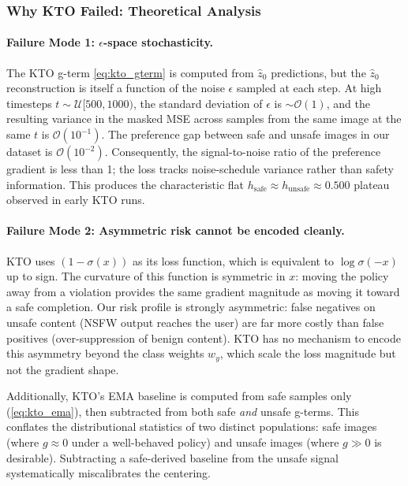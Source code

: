 \subsubsection{Why KTO Failed: Theoretical Analysis}

\paragraph{Failure Mode 1: $\epsilon$-space stochasticity.}
The KTO g-term \eqref{eq:kto_gterm} is computed from $\hat{z}_0$
predictions, but the $\hat{z}_0$ reconstruction is itself a function of
the noise $\epsilon$ sampled at each step.
At high timesteps $t \sim \mathcal{U}[500, 1000)$, the standard deviation
of $\epsilon$ is $\sim\!\mathcal{O}(1)$, and the resulting variance in the
masked MSE across samples from the same image at the same $t$ is
$\mathcal{O}(10^{-1})$.
The preference gap between safe and unsafe images in our dataset is
$\mathcal{O}(10^{-2})$.
Consequently, the signal-to-noise ratio of the preference gradient is less
than 1; the loss tracks noise-schedule variance rather than safety
information.
This produces the characteristic flat
$h_\text{safe} \approx h_\text{unsafe} \approx 0.500$ plateau observed in
early KTO runs.

\paragraph{Failure Mode 2: Asymmetric risk cannot be encoded cleanly.}
KTO uses $(1 - \sigma(x))$ as its loss function, which is equivalent to
$\log \sigma(-x)$ up to sign.
The curvature of this function is symmetric in $x$: moving the policy away
from a violation provides the same gradient magnitude as moving it toward
a safe completion.
Our risk profile is strongly asymmetric: false negatives on unsafe content
(NSFW output reaches the user) are far more costly than false positives
(over-suppression of benign content).
KTO has no mechanism to encode this asymmetry beyond the class weights
$w_y$, which scale the loss magnitude but not the gradient shape.

Additionally, KTO's EMA baseline is computed from safe samples only
(\eqref{eq:kto_ema}), then subtracted from both safe \emph{and} unsafe
g-terms.
This conflates the distributional statistics of two distinct populations:
safe images (where $g \approx 0$ under a well-behaved policy) and unsafe
images (where $g \gg 0$ is desirable).
Subtracting a safe-derived baseline from the unsafe signal systematically
miscalibrates the centering.

